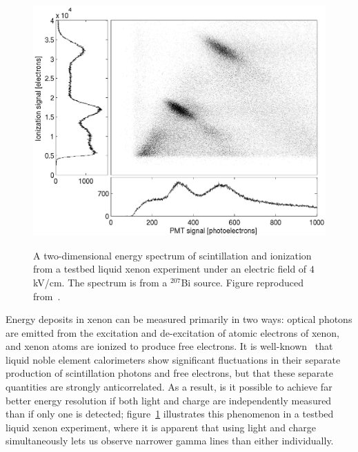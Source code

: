 \begin{figure}
\begin{center}
\includegraphics[keepaspectratio=true,width=\textwidth]{4kV_correl1.eps}
\end{center}
\renewcommand{\baselinestretch}{1}
\small\normalsize
\begin{quote}
\caption{A two-dimensional energy spectrum of scintillation and ionization from a testbed liquid xenon experiment under an electric field of $4$ kV/cm.  The spectrum is from a $^{207}$Bi source.  Figure reproduced from~\cite{PhysRevB.68.054201}.}
\label{fig:AnticorrelationInXenon}
\end{quote}
\end{figure}
\renewcommand{\baselinestretch}{2}
\small\normalsize

Energy deposits in xenon can be measured primarily in two ways: optical photons are emitted from the excitation and de-excitation of atomic electrons of xenon, and xenon atoms are ionized to produce free electrons.  It is well-known~\cite{PhysRevB.68.054201} that liquid noble element calorimeters show significant fluctuations in their separate production of scintillation photons and free electrons, but that these separate quantities are strongly anticorrelated.  As a result, is it possible to achieve far better energy resolution if both light and charge are independently measured than if only one is detected; figure~\ref{fig:AnticorrelationInXenon} illustrates this phenomenon in a testbed liquid xenon experiment, where it is apparent that using light and charge simultaneously lets us observe narrower gamma lines than either individually.

